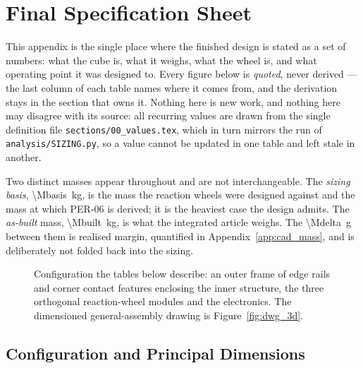 \section{Final Specification Sheet}
\label{app:specs}

This appendix is the single place where the finished design is stated as a set
of numbers: what the cube is, what it weighs, what the wheel is, and what
operating point it was designed to. Every figure below is \emph{quoted}, never
derived --- the last column of each table names where it comes from, and the
derivation stays in the section that owns it. Nothing here is new work, and
nothing here may disagree with its source: all recurring values are drawn from
the single definition file \texttt{sections/00\_values.tex}, which in turn
mirrors the run of \texttt{analysis/SIZING.py}, so a value cannot be updated in
one table and left stale in another.

Two distinct masses appear throughout and are not interchangeable. The
\emph{sizing basis}, \qty{\Mbasis}{\kilo\gram}, is the mass the reaction wheels
were designed against and the mass at which PER-06 is derived; it is the
heaviest case the design admits. The \emph{as-built} mass,
\qty{\Mbuilt}{\kilo\gram}, is what the integrated article weighs. The
\qty{\Mdelta}{\gram} between them is realised margin, quantified in
Appendix~\ref{app:cad_mass}, and is deliberately not folded back into the
sizing.

\begin{figure}[htbp]
\centering
{}
\caption[Configuration of the integrated cube]{Configuration the tables below
describe: an outer frame of edge rails and corner contact features enclosing
the inner structure, the three orthogonal reaction-wheel modules and the
electronics. The dimensioned general-assembly drawing is
Figure~\ref{fig:dwg_3d}.}
\label{fig:spec_config}
\end{figure}

\subsection{Configuration and Principal Dimensions}
\label{app:specs_dims}

